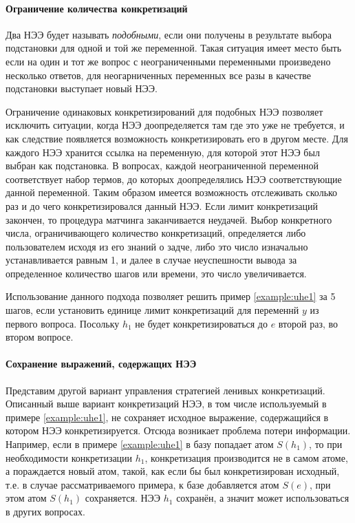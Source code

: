 
\paragraph{Ограничение количества конкретизаций}
Два НЭЭ будет называть \emph{подобными}, если они получены в результате выбора подстановки для одной и той же переменной. Такая ситуация имеет место быть если на один и тот же вопрос с неограниченными переменными произведено несколько ответов, для неогарниченных переменных все разы в качестве подстановки выступает новый НЭЭ.

Ограничение одинаковых конкретизирований для подобных НЭЭ позволяет исключить ситуации, когда НЭЭ доопределяется там где это уже не требуется, и как следствие появляется возможность конкретизировать его в другом месте. Для каждого НЭЭ хранится ссылка на переменную, для которой этот НЭЭ был выбран как подстановка. В вопросах, каждой неограниченной переменной соответствует набор термов, до которых доопределялись НЭЭ соответствующие данной переменной. Таким образом имеется возможность отслеживать сколько раз и до чего конкретизировался данный НЭЭ. Если лимит конкретизаций закончен, то процедура матчинга заканчивается неудачей. Выбор конкретного числа, ограничивающего количество конкретизаций, определяется либо пользователем исходя из его знаний о задче, либо это число изначально устанавливается равным 1, и далее в случае неуспешности вывода за определенное количество шагов или времени, это число увеличивается.

Использование данного подхода позволяет решить пример \ref{example:uhe1} за 5 шагов, если установить единице лимит конкретизаций для переменнй $y$ из первого вопроса. Посольку $h_1$ не будет конкретизироваться до $e$ второй раз, во втором вопросе. 

\paragraph{Сохранение выражений, содержащих НЭЭ}
Представим другой вариант управления стратегией ленивых конкретизаций. Описанный выше вариант конкретизаций НЭЭ, в том числе используемый в примере \ref{example:uhe1}, не сохраняет исходное выражение, содержащийся в котором НЭЭ конкретизируется. Отсюда возникает проблема потери информации. Например, если в примере \ref{example:uhe1} в базу попадает атом $S(h_1)$, то при необходимости конкретизации $h_1$, конкретизация производится не в самом атоме, а пораждается новый атом, такой, как если бы был конкретизирован исходный, т.е. в случае рассматриваемого примера, к базе добавляется атом $S(e)$, при этом атом $S(h_1)$ сохраняется. НЭЭ $h_1$ сохранён, а значит может использоваться в других вопросах.

